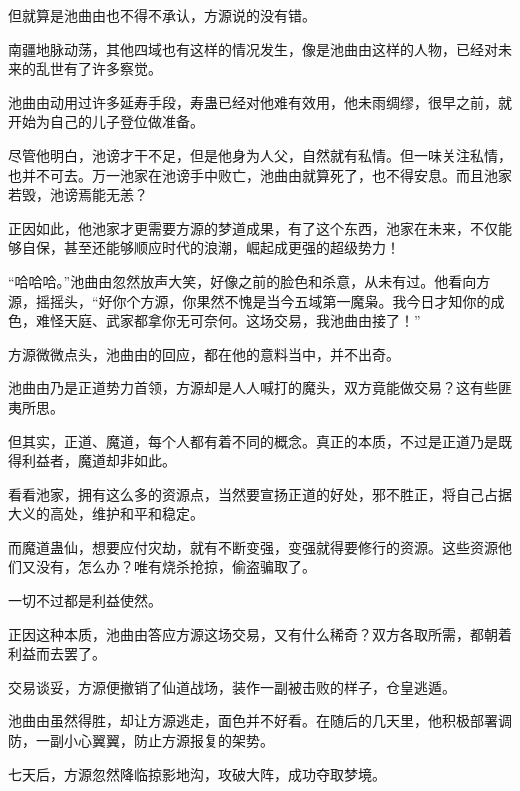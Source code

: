 \begin{this_body}
但就算是池曲由也不得不承认，方源说的没有错。

南疆地脉动荡，其他四域也有这样的情况发生，像是池曲由这样的人物，已经对未来的乱世有了许多察觉。

池曲由动用过许多延寿手段，寿蛊已经对他难有效用，他未雨绸缪，很早之前，就开始为自己的儿子登位做准备。

尽管他明白，池谤才干不足，但是他身为人父，自然就有私情。但一味关注私情，也并不可去。万一池家在池谤手中败亡，池曲由就算死了，也不得安息。而且池家若毁，池谤焉能无恙？

正因如此，他池家才更需要方源的梦道成果，有了这个东西，池家在未来，不仅能够自保，甚至还能够顺应时代的浪潮，崛起成更强的超级势力！

“哈哈哈。”池曲由忽然放声大笑，好像之前的脸色和杀意，从未有过。他看向方源，摇摇头，“好你个方源，你果然不愧是当今五域第一魔枭。我今日才知你的成色，难怪天庭、武家都拿你无可奈何。这场交易，我池曲由接了！”

方源微微点头，池曲由的回应，都在他的意料当中，并不出奇。

池曲由乃是正道势力首领，方源却是人人喊打的魔头，双方竟能做交易？这有些匪夷所思。

但其实，正道、魔道，每个人都有着不同的概念。真正的本质，不过是正道乃是既得利益者，魔道却非如此。

看看池家，拥有这么多的资源点，当然要宣扬正道的好处，邪不胜正，将自己占据大义的高处，维护和平和稳定。

而魔道蛊仙，想要应付灾劫，就有不断变强，变强就得要修行的资源。这些资源他们又没有，怎么办？唯有烧杀抢掠，偷盗骗取了。

一切不过都是利益使然。

正因这种本质，池曲由答应方源这场交易，又有什么稀奇？双方各取所需，都朝着利益而去罢了。

交易谈妥，方源便撤销了仙道战场，装作一副被击败的样子，仓皇逃遁。

池曲由虽然得胜，却让方源逃走，面色并不好看。在随后的几天里，他积极部署调防，一副小心翼翼，防止方源报复的架势。

七天后，方源忽然降临掠影地沟，攻破大阵，成功夺取梦境。

\end{this_body}

